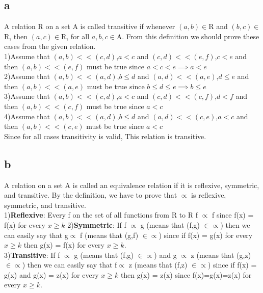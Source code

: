 \documentclass[12pt]{article}
\begin{document}
\subsection*{a}
A relation R on a set A is called transitive if whenever $(a, b) \in$R and $(b, c) \in$R, then $(a, c)  \in$R, for all $a,b,c\in$A. From this definition we should prove these cases from the given relation.\\ 1)Assume that $(a,b) << (c,d)$,$a<c$ and $(c,d) << (e,f)$,$c<e$ and then $(a,b) << (e,f)$  must be true since $a<c<e\implies a<e$ \\
2)Assume that $(a,b) << (a,d)$,$b\leq d$ and $(a,d) << (a,e)$,$d\leq e$ and then $(a,b) << (a,e)$ must be true since $b\leq d \leq e \implies b\leq e$ \\
3)Assume that $(a,b) << (c,d)$,$a<c$ and $(c,d) << (c,f)$,$d<f$ and then $(a,b) << (c,f)$  must be true since $a<c$ \\
4)Assume that $(a,b) << (a,d)$,$b\leq d$ and $(a,d) << (c,e)$,$a<c$ and then $(a,b) << (c,e)$ must be true since $a<c$ \\
Since for all cases transitivity is valid, This relation is transitive.
\subsection*{b}
A relation on a set A is called an equivalence relation if it is reflexive, symmetric, and
transitive. By the definition, we have to prove that $\propto$ is reflexive, symmetric, and
transitive.\\
1)\textbf{Reflexive}: Every f on the set of all functions from R to R f $\propto$ f since f(x) = f(x) for every $x\geq k$ 
2)\textbf{Symmetric}: If f $\propto$ g (means that (f,g) $\in \propto$) then we can easily say that g$\propto$ f (means that (g,f) $\in \propto$) since if f(x) = g(x)  for every $x\geq k$ then g(x) = f(x) for every $x\geq k$. \\
3)\textbf{Transitive}: If f $\propto$ g (means that (f,g) $\in \propto$) and g $\propto$ z (means that (g,z) $\in \propto$)  then we can easily say that f$\propto$ z (means that (f,z) $\in \propto$) since if f(x) = g(x) and g(x) = z(x)  for every $x\geq k$ then g(x) = z(x) since f(x)=g(x)=z(x) for every $x\geq k$. \\
\end{document}
